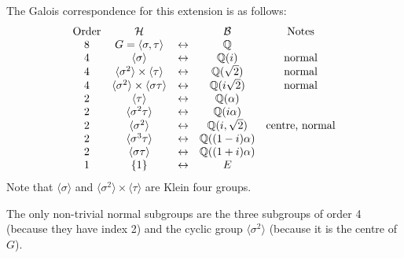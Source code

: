 \begin{example}
	The Galois correspondence for this extension is as follows:
	\[
		\begin{matrix}
			\text{Order} & \mathcal{H} & & \mathcal{B} & \text{Notes} \\
			8 & G = \langle \sigma, \tau \rangle & \leftrightarrow & \mathbb{Q} & \\
			4 & \langle \sigma \rangle & \leftrightarrow & \mathbb{Q}(i) & \text{normal} \\
			4 & \langle \sigma^2 \rangle \times \langle \tau \rangle & \leftrightarrow & \mathbb{Q}(\sqrt{2}) & \text{normal} \\
			4 & \langle \sigma^2 \rangle \times \langle \sigma\tau \rangle & \leftrightarrow & \mathbb{Q}(i\sqrt{2}) & \text{normal} \\
			2 & \langle \tau \rangle & \leftrightarrow & \mathbb{Q}(\alpha) & \\
			2 & \langle \sigma^2 \tau \rangle & \leftrightarrow & \mathbb{Q}(i\alpha) & \\
			2 & \langle \sigma^2 \rangle & \leftrightarrow & \mathbb{Q}(i, \sqrt{2}) & \text{centre, normal} \\
			2 & \langle \sigma^3 \tau \rangle & \leftrightarrow & \mathbb{Q}((1 - i)\alpha) & \\
			2 & \langle \sigma\tau \rangle & \leftrightarrow & \mathbb{Q}((1 + i)\alpha) & \\
			1 & \{1\} & \leftrightarrow & E & 
		\end{matrix}
	\]
	Note that $\langle \sigma \rangle$ and $\langle \sigma^2 \rangle \times \langle \tau \rangle$ are Klein four groups.
	
	The only non-trivial normal subgroups are the three subgroups of order 4 (because they have index 2) and the cyclic group $\langle \sigma^2 \rangle$ (because it is the centre of $G$).
	

\end{example}
